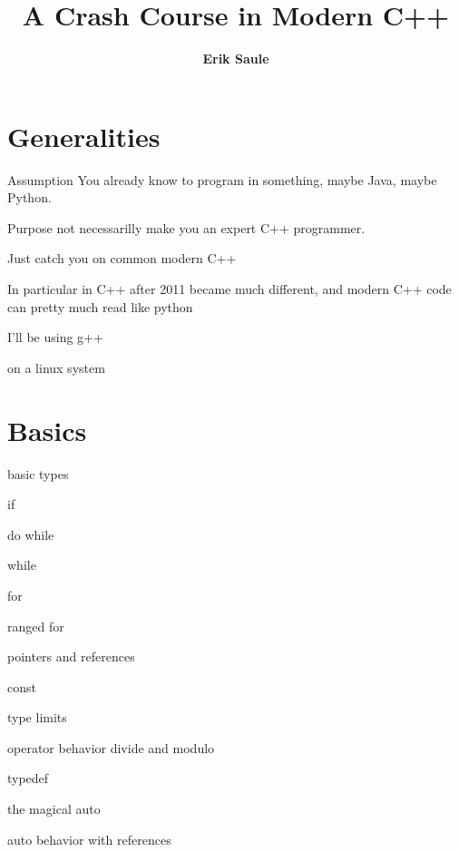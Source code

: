 \documentclass[aspectratio=169]{beamer}
\title{A Crash Course in Modern C++}
\author[Erik Saule]{{\bf Erik Saule}\\\email{esaule@uncc.edu}}
\date{}
\begin{document}
\maketitle

\section{Generalities}

\begin{frame}
  \begin{block}{Assumption}
    You already know to program in something, maybe Java, maybe Python.
  \end{block}

  \begin{block}{Purpose}
    not necessarilly make you an expert C++ programmer.

    Just catch you on common modern C++

    In particular in C++ after 2011 became much different, and modern
    C++ code can pretty much read like python
  \end{block}
\end{frame}

\begin{frame}
  I'll be using g++

  on a linux system

  
\end{frame}

\section{Basics}

\begin{frame}
  basic types
\end{frame}

\begin{frame}
  if

  do while

  while

  for

  ranged for   
\end{frame}

\begin{frame}
  pointers and references

  const
\end{frame}

\begin{frame}
  type limits

  operator behavior divide and modulo

  typedef

  the magical auto

  auto behavior with references
\end{frame}
\end{document}
